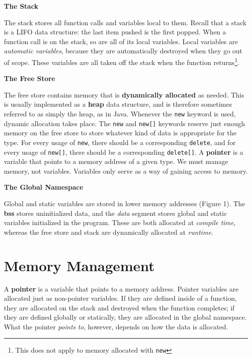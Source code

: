 \documentclass[12pt]{article}
\begin{document}
\textbf{The Stack}

The stack stores all function calls and variables local to them.
Recall that a stack is a LIFO data structure: the last item pushed is
the first popped. When a function call is on the stack, so are all of
its local variables.  Local variables are \textit{automatic
  variables}, because they are automatically destroyed when they go
out of scope.  These variables are all taken off the stack when the
function returns\footnote{This does not apply to memory allocated with
  \texttt{new}}.

\textbf{The Free Store}

The free store contains memory that is \textbf{dynamically allocated}
as needed.  This is usually implemented as a \textbf{heap} data
structure, and is therefore sometimes referred to as simply the heap,
as in Java.  Whenever the \texttt{new} keyword is used, dynamic
allocation takes place.  The \texttt{new} and \texttt{new[]} keywords
reserve just enough memory on the free store to store whatever kind of
data is appropriate for the type.  For every usage of \texttt{new},
there should be a corresponding \texttt{delete}, and for every usage
of \texttt{new[]}, there should be a corresponding \texttt{delete[]}.
A \textbf{pointer} is a variable that points to a memory address of a
given type. We must manage memory, not variables.  Variables only
serve as a way of gaining access to memory.
 
\textbf{The Global Namespace}

Global and static variables are stored in lower memory addresses
(Figure 1). The \textbf{bss} stores uninitialized data, and the
\textit{data} segment stores global and static variables initialized
in the program.  These are both allocated at \textit{compile time},
whereas the free store and stack are dynamically allocated at
\textit{runtime}.

\section{Memory Management}

A \textbf{pointer} is a variable that points to a memory
address. Pointer variables are allocated just as non-pointer
variables.  If they are defined inside of a function, they are
allocated on the stack and destroyed when the function completes; if
they are defined globally or statically, they are allocated in the
global namespace.  What the pointer \textit{points to}, however,
depends on how the data is allocated.
\end{document}
